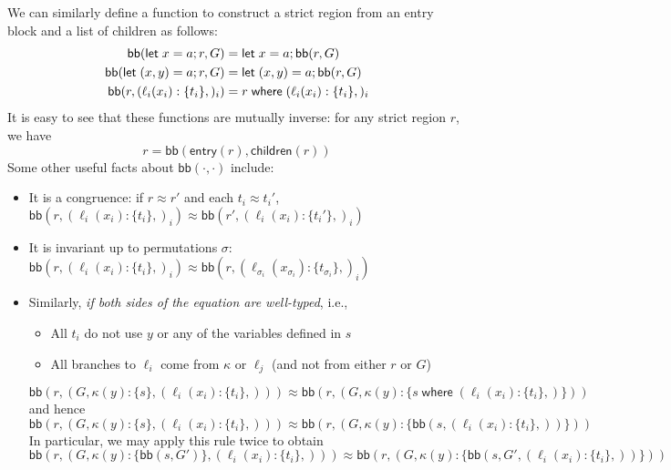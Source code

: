 \documentclass[acmsmall,screen,review]{acmart}
\newcommand{\ms}[1]{\ensuremath{\mathsf{#1}}}
\newcommand{\lto}{:}
\newcommand{\letstmt}[3]{\ensuremath{\ms{let}\;#1 = #2; #3}}
\newcommand{\where}[2]{#1\;\ms{where}\;#2}
\newcommand{\wbranch}[3]{#1(#2) \lto \{#3\}}
\newcommand{\teqv}{\approx}
\newcommand{\toentry}[1]{\ms{entry}(#1)}
\newcommand{\todom}[1]{\ms{children}(#1)}
\newcommand{\adddom}[2]{\ms{bb}(#1, #2)}
\begin{document}
We can similarly define a function to construct a strict region from an entry block and a list
of children as follows:
\begin{equation}
  \begin{aligned}
  \adddom{\letstmt{x}{a}{r}}{G} &= \letstmt{x}{a}{\adddom{r}}{G} \\
  \adddom{\letstmt{(x, y)}{a}{r}}{G} &= \letstmt{(x, y)}{a}{\adddom{r}}{G} \\
  \adddom{r}{(\wbranch{\ell_i}{x_i}{t_i},)_i} &= \where{r}{(\wbranch{\ell_i}{x_i}{t_i},)_i}
  \end{aligned}
\end{equation}
It is easy to see that these functions are mutually inverse: for any strict region $r$, we have
\begin{equation}
  r = \adddom{\toentry{r}}{\todom{r}}
\end{equation}
Some other useful facts about $\adddom{\cdot}{\cdot}$ include:
\begin{itemize}
  \item It is a congruence: if $r \teqv r'$ and each $t_i \teqv t_i'$,
  $\adddom{r}{(\wbranch{\ell_i}{x_i}{t_i},)_i} \teqv \adddom{r'}{(\wbranch{\ell_i}{x_i}{t_i'},)_i}$
  \item It is invariant up to permutations
  $\sigma$: $\adddom{r}{(\wbranch{\ell_i}{x_i}{t_i},)_i} \teqv 
    \adddom{r}{(\wbranch{\ell_{\sigma_i}}{x_{\sigma_i}}{t_{\sigma_i}},)_i}$
  \item Similarly, \emph{if both sides of the equation are well-typed}, i.e.,
  \begin{itemize}
    \item All $t_i$ do not use $y$ or any of the variables defined in $s$
    \item All branches to $\ell_i$ come from $\kappa$ or $\ell_j$ (and not from either $r$ or $G$)
  \end{itemize}
  \begin{equation}
    \adddom{r}{(G, \wbranch{\kappa}{y}{s}, (\wbranch{\ell_i}{x_i}{t_i},))} \teqv
    \adddom{r}{(G, \wbranch{\kappa}{y}{\where{s}{(\wbranch{\ell_i}{x_i}{t_i},)}})}
  \end{equation} 
  and hence
  \begin{equation}
    \adddom{r}{(G, \wbranch{\kappa}{y}{s}, (\wbranch{\ell_i}{x_i}{t_i},))} \teqv
    \adddom{r}{(G, \wbranch{\kappa}{y}{\adddom{s}{(\wbranch{\ell_i}{x_i}{t_i},)}})}
  \end{equation}
  In particular, we may apply this rule twice to obtain
  \begin{equation}
    \adddom{r}{(G, \wbranch{\kappa}{y}{\adddom{s}{G'}}, (\wbranch{\ell_i}{x_i}{t_i},))} \teqv
    \adddom{r}{(G, \wbranch{\kappa}{y}{\adddom{s}{G', (\wbranch{\ell_i}{x_i}{t_i},)}})}
    \label{eqn:pull-where}
  \end{equation}
\end{itemize}
\end{document}
